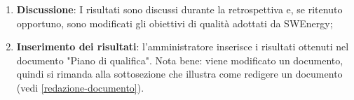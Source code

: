 \begin{itemize}
\begin{enumerate}
		      \item \textbf{Discussione}: I risultati sono discussi durante la
		            retrospettiva e, se ritenuto opportuno, sono modificati
		            gli obiettivi di qualità adottati da SWEnergy;

		      \item \textbf{Inserimento dei risultati}: l'amministratore
		            inserisce i risultati ottenuti nel documento "Piano di
		            qualifica".
		            Nota bene: viene modificato un documento, quindi si rimanda
		            alla sottosezione che illustra come redigere un documento
		            (vedi \autoref{redazione-documento}).
	      \end{enumerate}
\end{itemize}
